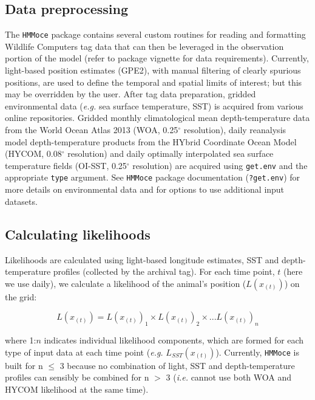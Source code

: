 \subsection{Data preprocessing}%

The \texttt{HMMoce} package contains several custom routines for reading and formatting Wildlife Computers tag data that can then be leveraged in the observation portion of the model (refer to package vignette for data requirements). Currently, light-based position estimates (GPE2), with manual filtering of clearly spurious positions, are used to define the temporal and spatial limits of interest; but this may be overridden by the user. After tag data preparation, gridded environmental data (\emph{e.g.} sea surface temperature, SST) is acquired from various online repositories. Gridded monthly climatological mean depth-temperature data from the World Ocean Atlas 2013 (WOA, 0.25$^{\circ}$ resolution), daily reanalysis model depth-temperature products from the HYbrid Coordinate Ocean Model (HYCOM, 0.08$^{\circ}$ resolution) and daily optimally interpolated sea surface temperature fields (OI-SST, 0.25$^{\circ}$ resolution) are acquired using \texttt{get.env} and the appropriate \texttt{type} argument. See \texttt{HMMoce} package documentation (\texttt{?get.env}) for more details on environmental data and for options to use additional input datasets.

\subsection{Calculating likelihoods}%

Likelihoods are calculated using light-based longitude estimates, SST and depth-temperature profiles (collected by the archival tag). For each time point, $t$ (here we use daily), we calculate a likelihood of the animal's position ($L(x_{(t)})$) on the grid:

\begin{equation}
L(x_{(t)}) = L(x_{(t)})_1 \times L(x_{(t)})_2 \times ... L(x_{(t)})_n
\label{eq:a1e1}
\end{equation}

where 1:$n$ indicates individual likelihood components, which are formed for each type of input data at each time point (\textit{e.g.} $L_{SST}(x_{(t)})$). Currently, \texttt{HMMoce} is built for n $\leq$ 3 because no combination of light, SST and depth-temperature profiles can sensibly be combined for n $>$ 3 (\emph{i.e.} cannot use both WOA and HYCOM likelihood at the same time).

